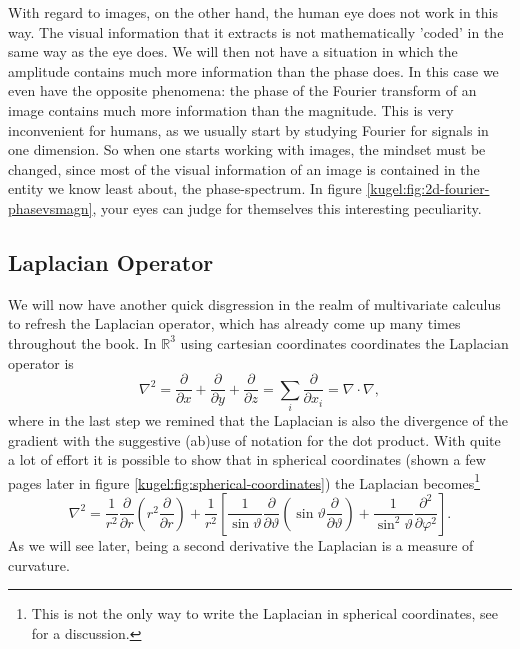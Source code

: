 With regard to images, on the other hand, the human eye does not work in this
way. The visual information that it extracts is not mathematically 'coded' in 
the same way as the eye does. We will then not have a situation in which the 
amplitude contains much more information than the phase does. In this case
we even have the opposite phenomena:
the phase of the Fourier transform of an image contains much more information
than the magnitude. This is very inconvenient for humans, as we usually start
by studying Fourier for signals in one dimension. So when one starts working
with images, the mindset must be changed, since most of the visual information
of an image is contained in the entity we know least about, the
phase-spectrum. In figure \ref{kugel:fig:2d-fourier-phasevsmagn}, your eyes
can judge for themselves this interesting peculiarity.

\subsection{Laplacian Operator}
\label{kugel:sec:preliminaries:laplacian}

We will now have another quick disgression in the realm of multivariate
calculus to refresh the Laplacian operator, which has already come up many
times throughout the book. In $\mathbb{R}^3$ using cartesian coordinates
coordinates the Laplacian operator is
\begin{equation*}
  \nabla^2 = \frac{\partial}{\partial x}
    + \frac{\partial}{\partial y}
    + \frac{\partial}{\partial z}
    = \sum_i \frac{\partial}{\partial x_i}
    = \nabla \cdot \nabla,
\end{equation*}
where in the last step we remined that the Laplacian is also the divergence of
the gradient with the suggestive (ab)use of notation for the dot product. With
quite a lot of effort it is possible to show that in spherical coordinates
(shown a few pages later in figure \ref{kugel:fig:spherical-coordinates}) the
Laplacian becomes\footnote{This is not the only way to write the Laplacian in
spherical coordinates, see
\cite{kugel:laplace}
for a discussion.}
\begin{equation*}
    \nabla^2 =
      \frac{1}{r^2} \frac{\partial}{\partial r} \left(
        r^2 \frac{\partial}{\partial r}
      \right)
      + \frac{1}{r^2} \left[
          \frac{1}{\sin\vartheta} \frac{\partial}{\partial \vartheta} \left(
            \sin\vartheta \frac{\partial}{\partial\vartheta}
          \right)
        + \frac{1}{\sin^2 \vartheta} \frac{\partial^2}{\partial\varphi^2}
      \right].
\end{equation*}
As we will see later, being a second derivative the Laplacian is a measure of
curvature.

